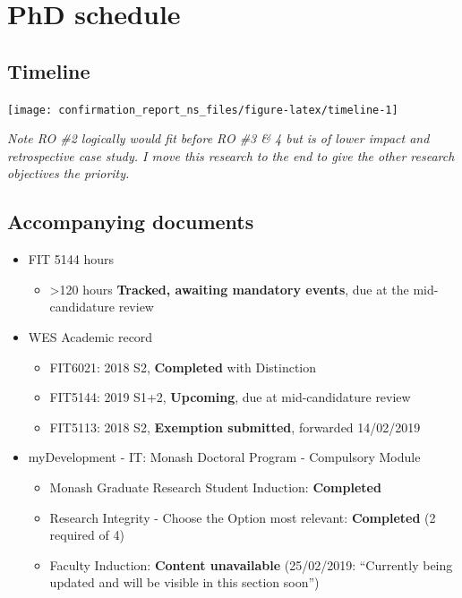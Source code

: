 \documentclass{monashthesis}
\begin{document}
\chapter{PhD schedule}\label{ch:timeline}

\section{Timeline}\label{timeline}

\begin{center}\texttt{[image: confirmation\_report\_ns\_files/figure-latex/timeline-1]} \end{center}

\emph{Note RO \#2 logically would fit before RO \#3 \& 4 but is of lower
impact and retrospective case study. I move this research to the end to
give the other research objectives the priority.}

\section{Accompanying documents}\label{accompanying-documents}

\begin{itemize}
\tightlist
\item
  FIT 5144 hours

  \begin{itemize}
  \tightlist
  \item
    \textgreater{}120 hours \textbf{Tracked, awaiting mandatory events},
    due at the mid-candidature review
  \end{itemize}
\item
  WES Academic record

  \begin{itemize}
  \tightlist
  \item
    FIT6021: 2018 S2, \textbf{Completed} with Distinction
  \item
    FIT5144: 2019 S1+2, \textbf{Upcoming}, due at mid-candidature review
  \item
    FIT5113: 2018 S2, \textbf{Exemption submitted}, forwarded 14/02/2019
  \end{itemize}
\item
  myDevelopment - IT: Monash Doctoral Program - Compulsory Module

  \begin{itemize}
  \tightlist
  \item
    Monash Graduate Research Student Induction: \textbf{Completed}
  \item
    Research Integrity - Choose the Option most relevant:
    \textbf{Completed} (2 required of 4)
  \item
    Faculty Induction: \textbf{Content unavailable} (25/02/2019:
    ``Currently being updated and will be visible in this section
    soon'')
  \end{itemize}
\end{itemize}
\end{document}
